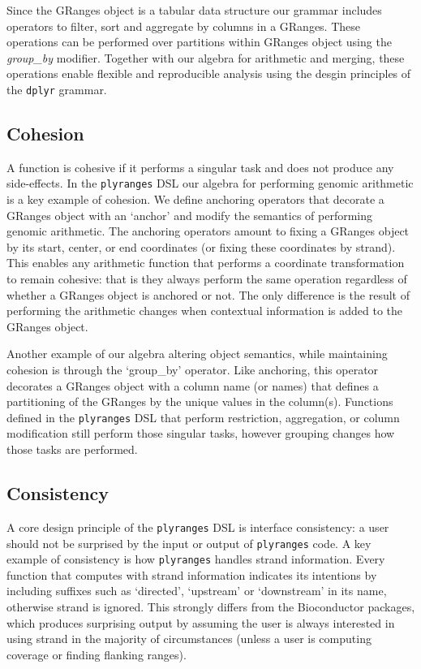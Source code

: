 \documentclass[10pt,letterpaper]{article}
\begin{document}
Since the GRanges object is a tabular data structure our grammar
includes operators to filter, sort and aggregate by columns in a
GRanges. These operations can be performed over partitions within
GRanges object using the \emph{group\_by} modifier. Together with our
algebra for arithmetic and merging, these operations enable flexible and
reproducible analysis using the desgin principles of the \texttt{dplyr}
grammar.

\hypertarget{cohesion}{%
\subsection{Cohesion}\label{cohesion}}

A function is cohesive if it performs a singular task and does not
produce any side-effects. In the \texttt{plyranges} DSL our algebra for
performing genomic arithmetic is a key example of cohesion. We define
anchoring operators that decorate a GRanges object with an `anchor' and
modify the semantics of performing genomic arithmetic. The anchoring
operators amount to fixing a GRanges object by its start, center, or end
coordinates (or fixing these coordinates by strand). This enables any
arithmetic function that performs a coordinate transformation to remain
cohesive: that is they always perform the same operation regardless of
whether a GRanges object is anchored or not. The only difference is the
result of performing the arithmetic changes when contextual information
is added to the GRanges object.

Another example of our algebra altering object semantics, while
maintaining cohesion is through the `group\_by' operator. Like
anchoring, this operator decorates a GRanges object with a column name
(or names) that defines a partitioning of the GRanges by the unique
values in the column(s). Functions defined in the \texttt{plyranges} DSL
that perform restriction, aggregation, or column modification still
perform those singular tasks, however grouping changes how those tasks
are performed.

\hypertarget{consistency}{%
\subsection{Consistency}\label{consistency}}

A core design principle of the \texttt{plyranges} DSL is interface
consistency: a user should not be surprised by the input or output of
\texttt{plyranges} code. A key example of consistency is how
\texttt{plyranges} handles strand information. Every function that
computes with strand information indicates its intentions by including
suffixes such as `directed', `upstream' or `downstream' in its name,
otherwise strand is ignored. This strongly differs from the Bioconductor
packages, which produces surprising output by assuming the user is
always interested in using strand in the majority of circumstances
(unless a user is computing coverage or finding flanking ranges).
\end{document}
